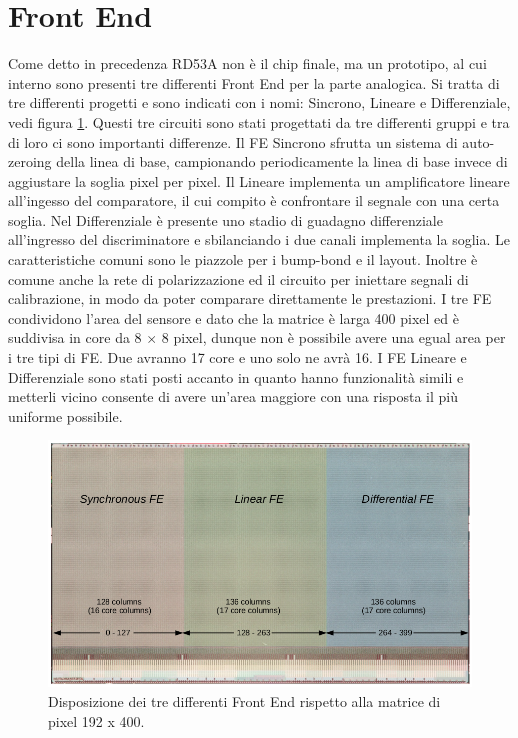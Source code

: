 \section{Front End}
Come detto in precedenza RD53A non è il chip finale, ma un prototipo, al cui interno sono presenti tre differenti Front End per la parte analogica. Si tratta di tre differenti progetti e sono indicati con i nomi: Sincrono, Lineare e Differenziale, vedi figura \ref{FrontEnd}. 
Questi tre circuiti sono stati progettati da tre differenti gruppi e tra di loro ci sono importanti differenze. Il FE Sincrono sfrutta un sistema di auto-zeroing della linea di base, campionando periodicamente la linea di base invece di aggiustare la soglia pixel per pixel. 
Il Lineare implementa un amplificatore lineare all'ingesso del comparatore, il cui compito è confrontare il segnale con una certa soglia. 
Nel Differenziale è presente uno stadio di guadagno differenziale  all'ingresso del discriminatore e sbilanciando i due canali implementa la soglia.
Le caratteristiche comuni sono le piazzole per i bump-bond e il layout. Inoltre è comune anche la rete di polarizzazione ed il circuito per iniettare segnali di calibrazione, in modo da poter comparare direttamente le prestazioni. 
I tre FE condividono l'area del sensore e dato che la matrice è larga 400 pixel ed è suddivisa in core da 8 $\times$ 8 pixel, dunque non è possibile avere una egual area per i tre tipi di FE. Due avranno 17 core e uno solo ne avrà 16. I FE Lineare e Differenziale sono stati posti accanto in quanto hanno funzionalità simili e metterli vicino consente di avere un'area maggiore con una risposta il più uniforme possibile. 
\begin{figure}
\centering
\includegraphics[scale=.3]{Immagini/FrontEnd}
\caption{Disposizione dei tre differenti Front End rispetto alla matrice di pixel 192 x 400.}
\label{FrontEnd}
\end{figure}

